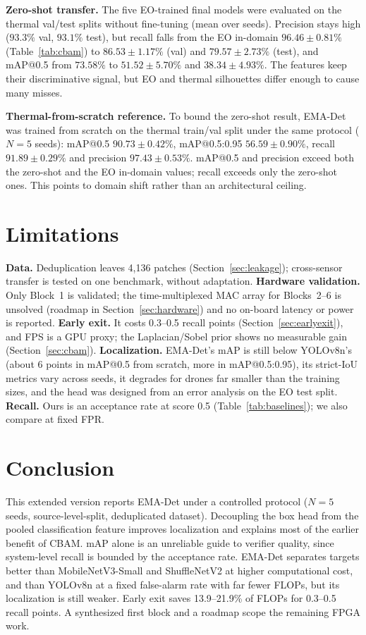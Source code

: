 \documentclass[pdflatex,sn-mathphys-num,iicol]{sn-jnl}%
\begin{document}
\textbf{Zero-shot transfer.} The five EO-trained final models were evaluated on
the thermal val/test splits without fine-tuning (mean over seeds). Precision stays
high ($93.3\%$ val, $93.1\%$ test), but recall falls from the EO in-domain
$96.46\pm0.81\%$ (Table~\ref{tab:cbam}) to $86.53\pm1.17\%$ (val) and $79.57\pm2.73\%$
(test), and mAP@0.5 from $73.58\%$ to $51.52\pm5.70\%$ and $38.34\pm4.93\%$. The
features keep their discriminative signal, but EO and thermal silhouettes differ
enough to cause many misses.

 \textbf{Thermal-from-scratch reference.} To bound the zero-shot result,
EMA-Det was trained from scratch on the thermal train/val split under
the same protocol ($N{=}5$ seeds): mAP@0.5 $90.73\pm0.42\%$, mAP@0.5:0.95
$56.59\pm0.90\%$, recall $91.89\pm0.29\%$ and precision $97.43\pm0.53\%$.
mAP@0.5 and precision exceed both the zero-shot and the EO in-domain values;
recall exceeds only the zero-shot ones. This points to domain shift
rather than an architectural ceiling.

\section{Limitations}\label{sec:limitations}
 \textbf{Data.} Deduplication leaves 4{,}136 patches
(Section~\ref{sec:leakage}); cross-sensor transfer is tested on one benchmark, without adaptation.
\textbf{Hardware validation.} Only Block~1 is validated; the time-multiplexed
MAC array for Blocks~2--6 is unsolved (roadmap in Section~\ref{sec:hardware})
and no on-board latency or power is reported. \textbf{Early exit.} It costs
0.3--0.5 recall points (Section~\ref{sec:earlyexit}), and FPS is a GPU proxy; the
Laplacian/Sobel prior shows no measurable gain (Section~\ref{sec:cbam}). \textbf{Localization.} EMA-Det's mAP is still below YOLOv8n's (about 6 points
in mAP@0.5 from scratch, more in mAP@0.5:0.95), its strict-IoU metrics vary
across seeds, it degrades for drones far smaller than the training sizes, and the head
was designed from an error analysis on the EO test split.
\textbf{Recall.} Ours is an acceptance rate at score 0.5 (Table~\ref{tab:baselines}); we also compare at fixed FPR.

\section{Conclusion}\label{sec:conclusion}
 This extended version reports EMA-Det under a controlled protocol ($N{=}5$ seeds,
source-level-split, deduplicated dataset). Decoupling the box head from the
pooled classification feature improves localization and explains most of the
earlier benefit of CBAM. mAP alone is an unreliable guide to verifier quality, since
system-level recall is bounded by the acceptance rate. EMA-Det
separates targets better than MobileNetV3-Small and ShuffleNetV2 at higher
computational cost, and than YOLOv8n at a fixed false-alarm rate with far fewer
FLOPs, but its localization is still weaker. Early exit saves 13.9--21.9\% of
FLOPs for 0.3--0.5 recall points. A synthesized first block and a roadmap
scope the remaining FPGA work.
\end{document}
